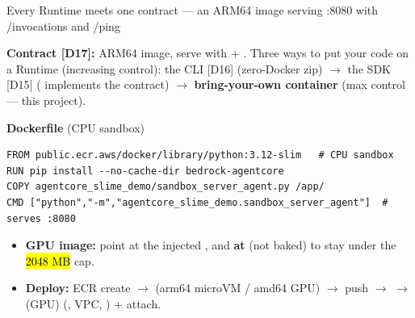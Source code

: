 \begin{frame}[fragile]{Every Runtime meets one contract --- an ARM64 image serving :8080 with /invocations and /ping}
{\footnotesize\textbf{Contract [D17]:} ARM64 image, serve  with  + . Three ways to put your code on a Runtime (increasing control): the  CLI [D16] (zero-Docker zip) $\rightarrow$ the  SDK [D15] ( implements the contract) $\rightarrow$ \textbf{bring-your-own container} (max control --- this project).\par}
\vspace{2mm}
{\footnotesize\textbf{Dockerfile} \textcolor{inkmuted}{(CPU sandbox)}\par}
\begin{lstlisting}[basicstyle=\ttfamily\scriptsize\color{bodytext}]
FROM public.ecr.aws/docker/library/python:3.12-slim   # CPU sandbox
RUN pip install --no-cache-dir bedrock-agentcore
COPY agentcore_slime_demo/sandbox_server_agent.py /app/
CMD ["python","-m","agentcore_slime_demo.sandbox_server_agent"]  # serves :8080
\end{lstlisting}
\begin{itemize}\scriptsize\setlength{\itemsep}{0.8mm}
\item \textbf{GPU image:} point  at the injected , and  \textbf{at } (not baked) to stay under the \hl{2048 MB} cap.
\item \textbf{Deploy:} ECR create $\rightarrow$  (arm64 microVM / amd64 GPU) $\rightarrow$ push $\rightarrow$  $\rightarrow$ (GPU)  (, VPC, ) + attach.
\end{itemize}
\end{frame}

